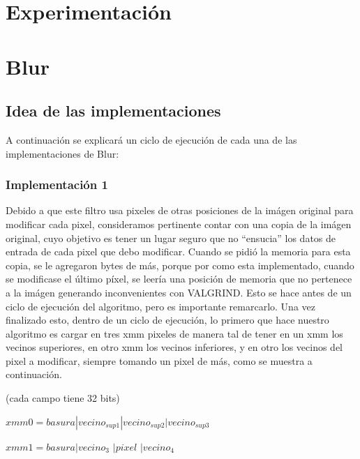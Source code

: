 \documentclass[a4paper]{article}
\begin{document}
\newpage

\section{Experimentación}


\newpage

\section{Blur}

\subsection{Idea de las implementaciones}
A continuación se explicará un ciclo de ejecución de cada una de las implementaciones de Blur:

\subsubsection{Implementación 1}

Debido a que este filtro usa pixeles de otras posiciones de la imágen original para modificar cada pixel, consideramos pertinente contar con una copia de la imágen original, cuyo objetivo es tener un lugar seguro que no ``ensucia'' los datos de entrada de cada pixel que debo modificar. Cuando se pidió la memoria para esta copia, se le agregaron bytes de más, porque por como esta implementado, cuando se modificase el último píxel, se leería una posición de memoria que no pertenece a la imágen generando inconvenientes con VALGRIND. Esto se hace antes de un ciclo de ejecución del algoritmo, pero es importante remarcarlo. Una vez finalizado esto, dentro de un ciclo de ejecución, lo primero que hace nuestro algoritmo es cargar en tres xmm pixeles de manera tal de tener en un xmm los vecinos superiores, en otro xmm los vecinos inferiores, y en otro los vecinos del pixel a modificar, siempre tomando un pixel de más, como se muestra a continuación.
\vspace*{0.3cm}

(cada campo tiene 32 bits)

$xmm0=  basura|vecino_{sup1}|vecino_{sup2}|vecino_{sup3}$

\vspace*{0.3cm}

$xmm1=  basura|vecino_3$           $|pixel$       $|vecino_4   $

\vspace*{0.3cm}
\end{document}
